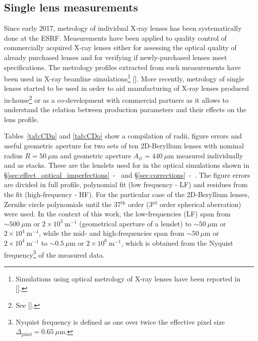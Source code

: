 \begin{refsection}
\clearpage

\section{Single lens measurements}\label{sec:single_lens}

Since early 2017, metrology of individual X-ray lenses has been systematically done at the ESRF. Measurements have been applied to quality control of commercially acquired X-ray lenses either for assessing the optical quality of already purchased lenses and for verifying if newly-purchased lenses meet specifications. The metrology profiles extracted from such measurements have been used in X-ray beamline simulations\footnote{Simulations using optical metrology of X-ray lenses have been reported in [\cite{Chubar2020}].} [\cite{Celestre2020}]. More recently, metrology of single lenses started to be used in order to aid manufacturing of X-ray lenses produced in-house\footnote{See [\cite{Celestre2020c}].} or as a co-development with commercial partners as it allows to understand the relation between production parameters and their effects on the lens profile.

Tables~\ref{tab:CDn} and \ref{tab:CDo} show a compilation of radii, figure errors and useful geometric aperture for two sets of ten 2D-Beryllium lenses with nominal radius $R=50~\mu\text{m}$ and geometric aperture $A_{\diameter}=440~\mu\text{m}$ measured individually and as stacks. These are the lenslets used for in the optical simulations shown in \S\ref{sec:effect_optical_imperfections}~-~\textit{} and \S\ref{sec:corrections}~-~\textit{}. The figure errors are divided in full profile, polynomial fit (low frequency - LF) and residues from the fit (high-frequency - HF). For the particular case of the 2D-Beryllium lenses, Zernike circle polynomials until the 37$^\text{th}$ order (3$^\text{rd}$ order spherical aberration) were used. In the context of this work, the low-frequencies (LF) span from $\sim500~\mu$m or $2\times10^{3}~\text{m}^{-1}$ (geometrical aperture of a lenslet) to $\sim50~\mu$m or $2\times10^{4}~\text{m}^{-1}$, while the mid- and high-frequencies span from $\sim50~\mu$m or $2\times10^{4}~\text{m}^{-1}$ to $\sim0.5~\mu$m or $2\times10^{6}~\text{m}^{-1}$, which is obtained from the Nyquist frequency\footnote{Nyquist frequency is defined as one over twice the effective pixel size $\Delta_\text{pixel}=0.65~\mu$m.} of the measured data.


\end{refsection}
